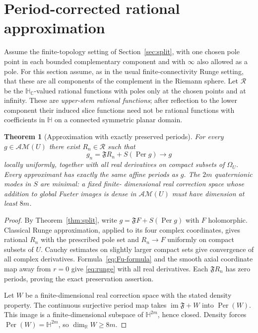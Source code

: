 \documentclass[11pt,a4paper]{article}
\numberwithin{equation}{section}
\newtheorem{theorem}{Theorem}[section]
\theoremstyle{definition}
\theoremstyle{remark}
\newcommand{\R}{\mathbb R}
\newcommand{\C}{\mathbb C}
\newcommand{\HH}{\mathbb H}
\newcommand{\HC}{\mathbb H_{\C}}
\newcommand{\Fu}{\mathfrak F}
\newcommand{\AM}{\mathcal{AM}}
\newcommand{\Per}{\operatorname{Per}}
\newcommand{\im}{\operatorname{im}}
\begin{document}
\section{Period-corrected rational approximation}
\label{sec:runge}

Assume the finite-topology setting of Section~\ref{sec:split}, with one
chosen pole point in each bounded complementary component and with
$\infty$ also allowed as a pole. For this section assume, as in the
usual finite-connectivity Runge setting, that these are all components
of the complement in the Riemann sphere. Let $\mathcal R$ be the
$\HC$-valued rational functions with poles only at the chosen points
and at infinity. These are \emph{upper-stem rational functions}; after
reflection to the lower component their induced slice functions need
not be rational functions with coefficients in $\HH$ on a connected
symmetric planar domain.

\begin{theorem}[Approximation with exactly preserved periods]
\label{thm:runge}
For every $g\in\AM(U)$ there exist $R_n\in\mathcal R$ such that
\begin{equation}\label{eq:runge}
 g_n=\Fu R_n+S(\Per g)\longrightarrow g
\end{equation}
locally uniformly, together with all real derivatives on compact subsets
of $\Omega_U$. Every approximant has exactly the same affine periods as
$g$. The $2m$ quaternionic modes in $S$ are minimal: a fixed finite-
dimensional real correction space whose addition to global Fueter
images is dense in $\AM(U)$ must have dimension at least $8m$.
\end{theorem}
\begin{proof}
By Theorem~\ref{thm:split}, write $g=\Fu F+S(\Per g)$ with $F$
holomorphic. Classical Runge approximation, applied to its four complex
coordinates, gives rational $R_n$ with the prescribed pole set and
$R_n\to F$ uniformly on compact subsets of $U$. Cauchy estimates on
slightly larger compact sets give convergence of all complex
derivatives. Formula~\eqref{eq:Fu-formula} and the smooth axial
coordinate map away from $r=0$ give \eqref{eq:runge} with all real
derivatives. Each $\Fu R_n$ has zero periods, proving the exact
preservation assertion.

Let $W$ be a finite-dimensional real correction space with the stated
density property. The continuous surjective period map takes
$\im\Fu+W$ into $\Per(W)$. This image is a finite-dimensional subspace
of $\HH^{2m}$, hence closed. Density forces
$\Per(W)=\HH^{2m}$, so $\dim_\R W\ge8m$.
\end{proof}
\end{document}
